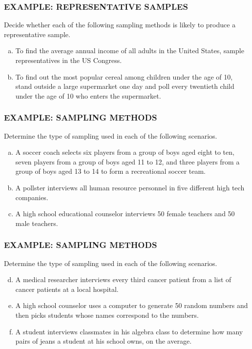\documentclass[8pt]{beamer}
\newcommand{\extitle}[1]{\frametitle{\fontfamily{fvs}\selectfont \small\color{black!70!blue!80!cyan}\uppercase{\bfseries Example: #1}}}
\begin{document}
\begin{frame}
\extitle{Representative Samples}
Decide whether each of the following sampling methods is likely to produce a representative sample.

\begin{enumerate}[(a)]
\item To find the average annual income of all adults in the United States, sample representatives in the US Congress.
\vfill

\item To find out the most popular cereal among children under the age of 10, stand outside a large supermarket one day and poll every twentieth child under the age of 10 who enters the supermarket.
\vfill
\text{}
\end{enumerate}
\end{frame}

\begin{frame}
\extitle{Sampling Methods}
Determine the type of sampling used in each of the following scenarios.

\begin{enumerate}[(a)]
\item A soccer coach selects six players from a group of boys aged eight to ten, seven players from a group of boys aged 11 to 12, and three players from a group of boys aged 13 to 14 to form a recreational soccer team.
\vfill

\item A pollster interviews all human resource personnel in five different high tech companies.
\vfill

\item A high school educational counselor interviews 50 female teachers and 50 male teachers.
\vfill
\text{}
\end{enumerate}
\end{frame}

\begin{frame}
\extitle{Sampling Methods}
Determine the type of sampling used in each of the following scenarios.

\begin{enumerate}[(a)]
\setcounter{enumi}{3}
\item A medical researcher interviews every third cancer patient from a list of cancer patients at a local hospital.
\vfill

\item A high school counselor uses a computer to generate 50 random numbers and then picks students whose names correspond to the numbers.
\vfill

\item A student interviews classmates in his algebra class to determine how many pairs of jeans a student at his school owns, on the average.
\vfill
\text{}
\end{enumerate}
\end{frame}
\end{document}
